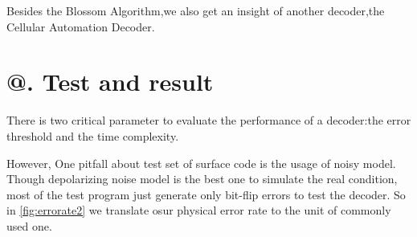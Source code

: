 \documentclass[
	a4paper, %
	10pt, %
	unnumberedsections, %
	twoside, %
]{LTJournalArticle}
\makeatletter
\newcommand{\Rmnum}[1]{\expandafter\@slowromancap\romannumeral #1@}
\makeatother
\begin{document}
Besides the Blossom Algorithm,we also get an insight of another decoder,the Cellular Automation Decoder.





\section{\Rmnum{5}. Test and result}

There is two critical parameter to evaluate the performance of a decoder:the error threshold and the time complexity.

However, One pitfall about test set of surface code is the usage of noisy model.
Though depolarizing noise model is the best one to simulate the real condition, 
most of the test program just generate only bit-flip errors to test the decoder.
So in \ref{fig:errorate2} we translate osur physical error rate
to the unit of commonly used one.
\end{document}
